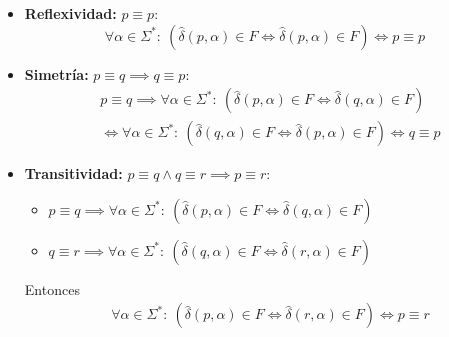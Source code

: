 \begin{demo}
  \begin{itemize}
    \item \textbf{Reflexividad:} \(p\equiv p\):
          \[ \forall \alpha \in \Sigma^*:~(\hat\delta(p,\alpha) \in F \iff \hat\delta(p,\alpha) \in F) \iff p \equiv p \]
    \item \textbf{Simetría:} \(p\equiv q \implies q\equiv p\):
          \begin{align*}
             & p \equiv q \implies \forall \alpha \in \Sigma^*:~(\hat\delta(p,\alpha) \in F \iff \hat\delta(q,\alpha) \in F)  \\
             & \iff \forall \alpha \in \Sigma^*:~(\hat\delta(q,\alpha) \in F \iff \hat\delta(p,\alpha) \in F) \iff q \equiv p
          \end{align*}
    \item \textbf{Transitividad:} \(p\equiv q \land q\equiv r \implies p\equiv r\):
          \begin{itemize}
            \item[] \(p \equiv q \implies \forall \alpha \in \Sigma^*:~(\hat\delta(p,\alpha) \in F \iff \hat\delta(q,\alpha) \in F)\)
            \item[] \(q \equiv r \implies \forall \alpha \in \Sigma^*:~(\hat\delta(q,\alpha) \in F \iff \hat\delta(r,\alpha) \in F)\)
          \end{itemize}
          Entonces
          \begin{align*}
             & \forall \alpha \in \Sigma^*:~(\hat\delta(p,\alpha) \in F \iff \hat\delta(r,\alpha) \in F) \iff p \equiv r
          \end{align*}
  \end{itemize}
\end{demo}
